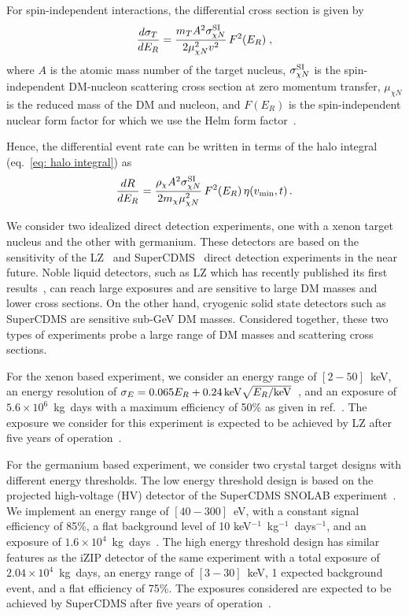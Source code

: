 For spin-independent interactions, the differential cross section is given by
\begin{equation}
  \frac{d\sigma_T}{dE_R}=\frac{m_T A^2 \sigma^{\rm SI}_{\chi N}}{2\mu_{\chi N}^2v^2}\,F^2(E_R)\; ,
\end{equation}
where $A$ is the atomic mass number of the target nucleus, $\sigma^{\rm SI}_{\chi N}$ is the spin-independent DM-nucleon scattering cross section at zero momentum transfer, $\mu_{\chi N}$ is the reduced mass of the DM and nucleon, and $F(E_R)$ is the spin-independent nuclear form factor for which we use the Helm form factor~\cite{Helm:1956zz}.

Hence, the differential event rate can be written in terms of the halo integral (eq.~\eqref{eq: halo integral}) as
\begin{equation}
    \frac{dR}{dE_R} = \frac{\rho_\chi A^2 \sigma^{\rm SI}_{\chi N}}{2 m_\chi \mu_{\chi N}^2}\,F^2(E_R)\,\eta (v_{\rm min}, t)\, .
\end{equation}



We consider two idealized direct detection experiments, one with a xenon target nucleus and the other with germanium. These detectors are based on the sensitivity of the  LZ~\cite{LZ:2022lsv, lz2015} and SuperCDMS~\cite{supercdms} direct detection experiments in the near future. Noble liquid detectors, such as LZ which has recently published its first results~\cite{LZ:2022lsv}, can reach large exposures and are sensitive to large DM masses and lower cross sections. On the other hand, cryogenic solid state detectors such as SuperCDMS are sensitive sub-GeV DM masses. Considered together, these two types of experiments probe a large range of DM masses and scattering cross sections.





For the xenon based experiment, we consider an energy range of $[2 -50]$~keV, an energy resolution of $\sigma_E=0.065 E_R+0.24\,{\rm keV}\sqrt{E_R/{\rm keV}}$~\cite{Bertone:2017adx}, and an exposure of $5.6\times 10^6$~kg~days with a maximum efficiency of 50\% as given in ref.~\cite{lz2015}. 
The exposure we consider for this experiment is expected to be achieved by LZ after five years of operation~\cite{lz2015}.

For the germanium based experiment, we consider two crystal target designs with different energy thresholds. The low energy threshold design is based on the projected high-voltage (HV) detector of the SuperCDMS SNOLAB experiment~\cite{supercdms}. We implement an energy  range of $[40 - 300]$~eV, with a constant signal efficiency of 85\%, a flat background level of 10 keV$^{-1}$~kg$^{-1}$~days$^{-1}$, and an exposure of $1.6\times10^4$~kg~days~\cite{supercdms, Kahlhoefer:2017ddj}. The high energy threshold design has similar features as the iZIP detector of the same experiment with a total exposure of $2.04\times10^4$~kg~days, an energy range of $[3 - 30]$~keV, 1 expected background event, and a flat efficiency of 75\%. The exposures considered are expected to be achieved by SuperCDMS after five years of operation~\cite{supercdms}.

